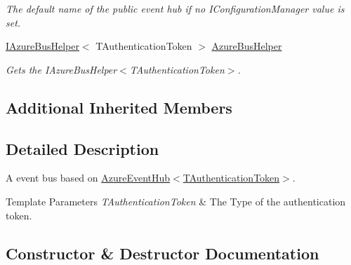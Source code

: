 \begin{DoxyCompactItemize}
\begin{DoxyCompactList}\small\item\em The default name of the public event hub if no I\+Configuration\+Manager value is set. \end{DoxyCompactList}\item 
\hyperlink{interfaceCqrs_1_1Azure_1_1ServiceBus_1_1IAzureBusHelper}{I\+Azure\+Bus\+Helper}$<$ T\+Authentication\+Token $>$ \hyperlink{classCqrs_1_1Azure_1_1ServiceBus_1_1AzureEventHubBus_ac70c513a41f42208cc3332d4ed855af8_ac70c513a41f42208cc3332d4ed855af8}{Azure\+Bus\+Helper}
\begin{DoxyCompactList}\small\item\em Gets the I\+Azure\+Bus\+Helper$<$\+T\+Authentication\+Token$>$. \end{DoxyCompactList}\end{DoxyCompactItemize}
\subsection*{Additional Inherited Members}


\subsection{Detailed Description}
A event bus based on \hyperlink{classCqrs_1_1Azure_1_1ServiceBus_1_1AzureEventHub_a2b548165ac5b1e3d0312af5c62e3c6cd_a2b548165ac5b1e3d0312af5c62e3c6cd}{Azure\+Event\+Hub$<$\+T\+Authentication\+Token$>$}. 


\begin{DoxyTemplParams}{Template Parameters}
{\em T\+Authentication\+Token} & The Type of the authentication token.\\
\hline
\end{DoxyTemplParams}


\subsection{Constructor \& Destructor Documentation}
\mbox{\label{classCqrs_1_1Azure_1_1ServiceBus_1_1AzureEventHubBus_a1012686c6448f1cee1d06aca0a605df4_a1012686c6448f1cee1d06aca0a605df4}} 
